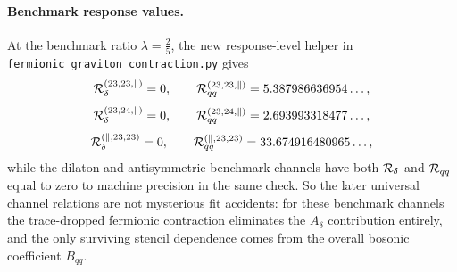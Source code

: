 \documentclass[11pt]{article}
\numberwithin{equation}{section}
\begin{document}
\paragraph{Benchmark response values.}
At the benchmark ratio $\lambda=\frac25$, the new response-level helper in
\texttt{fermionic\_graviton\_contraction.py} gives
\begin{equation}
\label{eq:s15-1-038d4}
{\cal R}^{(23,23,\parallel)}_\delta=0,
\qquad
{\cal R}^{(23,23,\parallel)}_{qq}=5.387986636954\ldots,
\end{equation}
\begin{equation}
\label{eq:s15-1-038d5}
{\cal R}^{(23,24,\parallel)}_\delta=0,
\qquad
{\cal R}^{(23,24,\parallel)}_{qq}=2.693993318477\ldots,
\end{equation}
\begin{equation}
\label{eq:s15-1-038d6}
{\cal R}^{(\parallel,23,23)}_\delta=0,
\qquad
{\cal R}^{(\parallel,23,23)}_{qq}=33.674916480965\ldots,
\end{equation}
while the dilaton and antisymmetric benchmark channels have both
\(
{\cal R}_\delta
\)
and
\(
{\cal R}_{qq}
\)
equal to zero to machine precision in the same check.
So the later universal channel relations are not mysterious fit accidents: for these benchmark channels the trace-dropped fermionic contraction eliminates the $A_\delta$ contribution entirely, and the only surviving stencil dependence comes from the overall bosonic coefficient $B_{qq}$.
\end{document}

